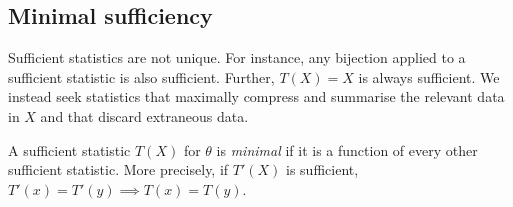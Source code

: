 \subsection{Minimal sufficiency}
Sufficient statistics are not unique.
For instance, any bijection applied to a sufficient statistic is also sufficient.
Further, \( T(X) = X \) is always sufficient.
We instead seek statistics that maximally compress and summarise the relevant data in \( X \) and that discard extraneous data.
\begin{definition}
	A sufficient statistic \( T(X) \) for \( \theta \) is \textit{minimal} if it is a function of every other sufficient statistic.
	More precisely, if \( T'(X) \) is sufficient, \( T'(x) = T'(y) \implies T(x) = T(y) \).
\end{definition}
